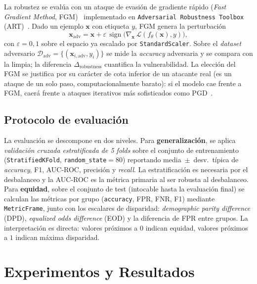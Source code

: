 \documentclass[11pt,a4paper]{article}
\begin{document}
La robustez se evalúa con un ataque de evasión de gradiente rápido (\textit{Fast Gradient Method}, FGM)~\cite{goodfellow2015explaining} implementado en \texttt{Adversarial Robustness Toolbox} (ART)~\cite{nicolae2018art}. Dado un ejemplo $\bm{x}$ con etiqueta $y$, FGM genera la perturbación
\begin{equation}
    \bm{x}_{\text{adv}} = \bm{x} + \varepsilon\,\operatorname{sign}\!\bigl(\nabla_{\bm{x}}\,\mathcal{L}(f_\theta(\bm{x}),y)\bigr),
    \label{eq:fgm}
\end{equation}
con $\varepsilon=0{,}1$ sobre el espacio ya escalado por \texttt{StandardScaler}. Sobre el \textit{dataset} adversario $\mathcal{D}_{\text{adv}}=\{(\bm{x}_{i,\text{adv}},y_i)\}$ se mide la \textit{accuracy} adversaria y se compara con la limpia; la diferencia $\Delta_{\text{robustness}}$ cuantifica la vulnerabilidad. La elección del FGM se justifica por su carácter de cota inferior de un atacante real (es un ataque de un solo paso, computacionalmente barato): si el modelo cae frente a FGM, caerá frente a ataques iterativos más sofisticados como PGD~\cite{madry2018towards}.

\subsection{Protocolo de evaluación}

La evaluación se descompone en dos niveles. Para \textbf{generalización}, se aplica \emph{validación cruzada estratificada de 5 \textit{folds}} sobre el conjunto de entrenamiento (\texttt{StratifiedKFold}, \texttt{random\_state}$=80$) reportando media~$\pm$~desv.\ típica de \textit{accuracy}, F1, AUC-ROC, precisión y \textit{recall}. La estratificación es necesaria por el desbalanceo y la AUC-ROC es la métrica primaria al ser robusta al desbalanceo. Para \textbf{equidad}, sobre el conjunto de test (intocable hasta la evaluación final) se calculan las métricas por grupo (\texttt{accuracy}, FPR, FNR, F1) mediante \texttt{MetricFrame}, junto con los escalares de disparidad: \emph{demographic parity difference} (DPD), \emph{equalized odds difference} (EOD) y la diferencia de FPR entre grupos. La interpretación es directa: valores próximos a $0$ indican equidad, valores próximos a $1$ indican máxima disparidad.


\section{Experimentos y Resultados}
\label{sec:resultados}
\end{document}
